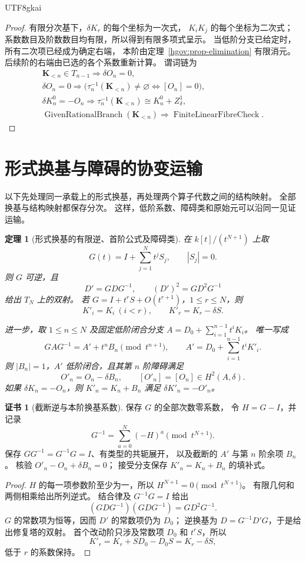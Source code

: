 \documentclass[12pt,a4paper,openany,notitlepage]{report}
\theoremstyle{plain}
\newtheorem{theorem}{定理}[chapter]
\theoremstyle{definition}
\newtheorem*{certificate}{证书}
\theoremstyle{remark}
\def\mathcal#1{#1}\def\mathsf#1{#1}\def\mathbb#1{#1}%
\begin{document}
\begin{CJK*}{UTF8}{gkai}
\begin{proof}
有限分次基下，$\delta K_r$ 的每个坐标为一次式，
$K_iK_j$ 的每个坐标为二次式；
系数数目及阶数数目均有限，所以得到有限多项式呈示。
当低阶分支已给定时，所有二次项已经成为确定右端，
本阶由定理~\ref{hgov:prop-elimination} 有限消元。
后续阶的右端由已选的各个系数重新计算。
谓词链为
\[
 \begin{gathered}
 \mathbf K_{<n}\in\mathcal T_{n-1}
 \Rightarrow \delta O_n=0,\\
 \delta O_n=0
 \Rightarrow
 \bigl(\tau_n^{-1}(\mathbf K_{<n})\ne\varnothing
       \Longleftrightarrow[O_n]=0\bigr),\\
 \delta K_n^0=-O_n
 \Rightarrow
 \tau_n^{-1}(\mathbf K_{<n})\cong K_n^0+Z^1_\delta,\\
 \operatorname{GivenRationalBranch}(\mathbf K_{<n})
 \Rightarrow\operatorname{FiniteLinearFibreCheck}.
 \end{gathered}
\]
\end{proof}

\section{形式换基与障碍的协变运输}
\label{exp:hom:obstruction-transport}

以下先处理同一承载上的形式换基，再处理两个算子代数之间的结构映射。
全部换基与结构映射都保存分次。
这样，低阶系数、障碍类和原始元可以沿同一见证运输。

\begin{theorem}[形式换基的有限逆、首阶公式及障碍类]
\label{exp:hom:formal-conjugation}
在 $\mathbb k[t]/(t^{N+1})$ 上取
\[
 G(t)=I+\sum_{j=1}^{N}t^jS_j,\qquad |S_j|=0.
\]
则 $G$ 可逆，且
\[
 D'=GDG^{-1},\qquad (D')^2=GD^2G^{-1}
\]
给出 $\mathcal T_N$ 上的双射。
若 $G=I+t^rS+O(t^{r+1})$，$1\le r\le N$，则
\[
 K'_i=K_i\ (i<r),\qquad K'_r=K_r-\delta S.
\]

进一步，取 $1\le n\le N$ 及固定低阶闭合分支
$A=D_0+\sum_{i=1}^{n-1}t^iK_i$。
唯一写成
\[
 GAG^{-1}=A'+t^nB_n\pmod{t^{n+1}},
 \qquad
 A'=D_0+\sum_{i=1}^{n-1}t^iK'_i.
\]
则 $|B_n|=1$，$A'$ 低阶闭合，且其第 $n$ 阶障碍满足
\[
 O'_n=O_n-\delta B_n,\qquad [O'_n]=[O_n]\in H^2(\mathcal A,\delta).
\]
如果 $\delta K_n=-O_n$，则
$K'_n=K_n+B_n$ 满足 $\delta K'_n=-O'_n$。
\end{theorem}
\begin{certificate}[截断逆与本阶换基系数]
保存 $G$ 的全部次数零系数，
令 $H=G-I$，并记录
\[
 G^{-1}=\sum_{a=0}^{N}(-H)^a\pmod{t^{N+1}}.
\]
保存 $GG^{-1}=G^{-1}G=I$、有类型的共轭展开，
以及截断的 $A'$ 与第 $n$ 阶余项 $B_n$。
核验 $O'_n-O_n+\delta B_n=0$；
接受分支保存 $K'_n=K_n+B_n$ 的填补式。
\end{certificate}
\begin{proof}
$H$ 的每一项参数阶至少为一，所以
$H^{N+1}=0\pmod{t^{N+1}}$。
有限几何和两侧相乘给出所列逆式。
结合律及 $G^{-1}G=I$ 给出
\[
 (GDG^{-1})(GDG^{-1})=GD^2G^{-1}.
\]
$G$ 的常数项为恒等，因而 $D'$ 的常数项仍为 $D_0$；
逆换基为 $D=G^{-1}D'G$，于是给出修复塔的双射。
首个改动阶只涉及常数项 $D_0$ 和 $t^rS$，所以
\[
 K'_r=K_r+SD_0-D_0S=K_r-\delta S,
\]
低于 $r$ 的系数保持。


\end{proof}
\end{CJK*}
\end{document}
